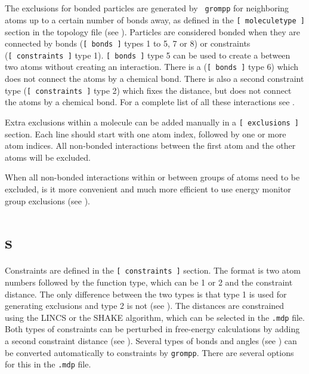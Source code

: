 \section{}
\label{sec:excl}
The exclusions for bonded particles are generated by {\tt
grompp} for neighboring atoms up to a certain number of bonds away, as
defined in the {\tt [~moleculetype~]} section in the topology file
(see ). Particles are considered bonded when they are
connected by bonds ({\tt [~bonds~]} types 1 to 5, 7 or 8) or constraints
({\tt [~constraints~]} type 1).
{\tt[~bonds~]} type 5 can be used to create a 
between two atoms without creating an interaction.
There is a 
({\tt[~bonds~]} type 6) which does not connect the atoms by a chemical bond.
There is also a second constraint type ({\tt[~constraints~]} type 2)
which fixes the distance, but does not connect
the atoms by a chemical bond.
For a complete list of all these interactions see .

Extra exclusions within a molecule can be added manually
in a {\tt [~exclusions~]} section. Each line should start with one
atom index, followed by one or more atom indices. All non-bonded
interactions between the first atom and the other atoms will be excluded.

When all non-bonded interactions within or between groups of atoms need
to be excluded, is it more convenient and much more efficient to use
energy monitor group exclusions (see ).

\section{s}
\label{sec:constraints}
Constraints are defined in the {\tt [~constraints~]} section.
The format is two atom numbers followed by the function type,
which can be 1 or 2 and the constraint distance.
The only difference between the two types is that type 1 is used
for generating exclusions and type 2 is not (see ).
The distances are constrained using the LINCS or the SHAKE algorithm,
which can be selected in the {\tt *.mdp} file.
Both types of constraints can be perturbed in free-energy calculations
by adding a second constraint distance (see ).
Several types of bonds and angles (see ) can
be converted automatically to constraints by {\tt grompp}.
There are several options for this in the {\tt *.mdp} file.

